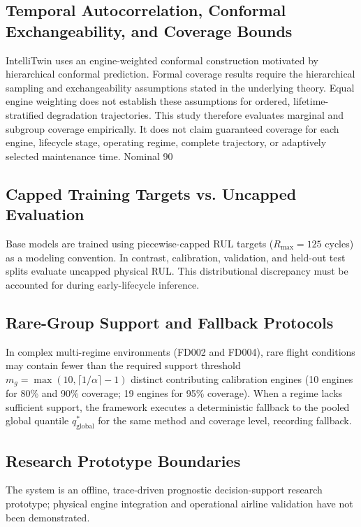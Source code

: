 \subsection{Temporal Autocorrelation, Conformal Exchangeability, and Coverage Bounds}
IntelliTwin uses an engine-weighted conformal construction motivated by hierarchical conformal prediction. Formal coverage results require the hierarchical sampling and exchangeability assumptions stated in the underlying theory. Equal engine weighting does not establish these assumptions for ordered, lifetime-stratified degradation trajectories. This study therefore evaluates marginal and subgroup coverage empirically. It does not claim guaranteed coverage for each engine, lifecycle stage, operating regime, complete trajectory, or adaptively selected maintenance time. Nominal 90%

\subsection{Capped Training Targets vs. Uncapped Evaluation}
Base models are trained using piecewise-capped RUL targets ($R_{\text{max}} = 125$ cycles) as a modeling convention. In contrast, calibration, validation, and held-out test splits evaluate uncapped physical RUL. This distributional discrepancy must be accounted for during early-lifecycle inference.

\subsection{Rare-Group Support and Fallback Protocols}
In complex multi-regime environments (FD002 and FD004), rare flight conditions may contain fewer than the required support threshold $m_g = \max(10, \lceil 1/\alpha \rceil - 1)$ distinct contributing calibration engines (10 engines for 80\% and 90\% coverage; 19 engines for 95\% coverage). When a regime lacks sufficient support, the framework executes a deterministic fallback to the pooled global quantile $q^*_{\text{global}}$ for the same method and coverage level, recording fallback.

\subsection{Research Prototype Boundaries}
The system is an offline, trace-driven prognostic decision-support research prototype; physical engine integration and operational airline validation have not been demonstrated.

